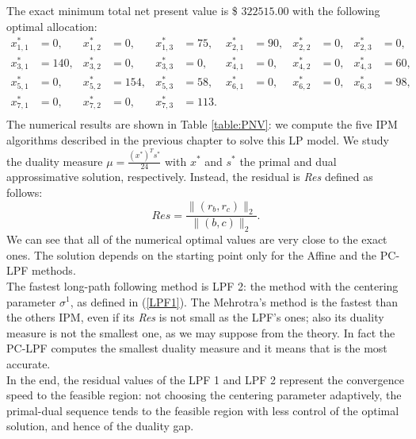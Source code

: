 \documentclass[a4paper,10 pt,titlepage,twoside]{book}
\theoremstyle{plain}
\theoremstyle{definition}
\theoremstyle{remark}
\begin{document}
The exact minimum total net present value is \$ $322515.00$ with the following optimal allocation:
\begin{align*}
x_{1,1}^{*} &=  0, & x_{1,2}^{*}&= 0, & x_{1,3}^{*} &= 75, & x_{2,1}^{*} &= 90, & x_{2,2}^{*} &= 0, & x_{2,3}^{*} &= 0,\\
x_{3,1}^{*} &= 140, & x_{3,2}^{*}&= 0, & x_{3,3}^{*} &= 0, & x_{4,1}^{*} &= 0, & x_{4,2}^{*} &= 0, & x_{4,3}^{*} &= 60,\\
x_{5,1}^{*} &= 0, & x_{5,2}^{*}&= 154, & x_{5,3}^{*} &= 58, & x_{6,1}^{*} &= 0, & x_{6,2}^{*} &= 0, & x_{6,3}^{*} &= 98,\\
 x_{7,1}^{*}&= 0,&x_{7,2}^{*} &= 0, & x_{7,3}^{*} &= 113. & & & &  & & \\
\end{align*}
The numerical results are shown in Table \ref{table:PNV}: we compute the five IPM algorithms described in the previous chapter to solve this LP model. We study the duality measure $\mu = \frac{(x^{*})^{T}s^{*}}{24}$ with $x^{*}$ and $s^{*}$ the primal and dual approssimative solution, respectively. Instead, the residual is \textit{Res} defined as follows:
\begin{equation*}
Res = \frac{\lVert (r_{b},r_{c})\rVert_{2}}{\lVert (b,c) \rVert_{2}}.
\end{equation*}  
We can see that all of the numerical optimal values are very close to the exact ones. The solution depends on the starting point only for the Affine and the PC-LPF methods.\\
The fastest long-path following method is LPF 2: the method with the centering parameter $\sigma^{1}$, as defined in (\ref{LPF1}).
The Mehrotra's method is the fastest than the others IPM, even if its \textit{Res} is not small as the LPF's ones; also its duality measure is not the smallest one, as we may suppose from the theory. In fact the PC-LPF computes the smallest duality measure and it means that is the most accurate.\\
In the end, the residual values of the LPF 1 and LPF 2 represent the convergence speed to the feasible region: not choosing the centering parameter adaptively, the primal-dual sequence tends to the feasible region with less control of the optimal solution, and hence of the duality gap.\\
\end{document}
